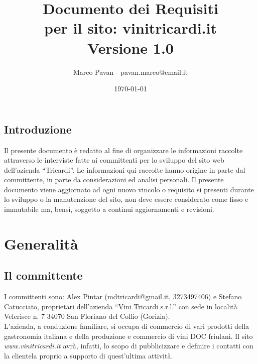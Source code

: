 \documentclass[a4paper]{report}	%
\title{Documento dei Requisiti \\ per il sito: vinitricardi.it \\ \small{Versione 1.0}}		%
\author{Marco Pavan - pavan.marco@email.it}		%
\date{\today}			%
\begin{document}

\maketitle			%


\newpage			%
\tableofcontents		
\listoffigures
\newpage

\section*{Introduzione}		%
Il presente documento è redatto al fine di organizzare le informazioni raccolte attraverso le interviste fatte ai committenti per lo sviluppo del sito web dell'azienda ``Tricardi''.
Le informazioni qui raccolte hanno origine in parte dal committente, in parte da considerazioni ed analisi personali.
Il presente documento viene aggiornato ad ogni nuovo vincolo o requisito si presenti durante lo sviluppo o la manutenzione del sito, non deve essere considerato come fisso e immutabile ma, bensì, soggetto a continui aggiornamenti e revisioni.

\chapter{Generalità}
\section{Il committente}I committenti sono: Alex Pintar (mdtricardi@gmail.it, 3273497406) e Stefano Catucciato, proprietari dell'azienda ``Vini Tricardi s.r.l.'' con sede in località Velerisce n. 7 34070 San Floriano del Collio (Gorizia). \\
L'azienda, a conduzione familiare, si occupa di commercio di vari prodotti della gastronomia italiana e della produzione e commercio di vini DOC friulani. Il sito \textit{www.vinitricardi.it} avrà, infatti, lo scopo di pubblicizzare e definire i contatti con la clientela proprio a supporto di quest'ultima attività.  
  
\end{document}
